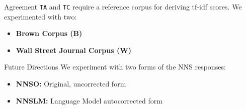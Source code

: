 \documentclass[final,t]{beamer}
\begin{document}
\begin{frame}{}
\begin{columns}[t]
\begin{column}{.64\linewidth}
\begin{columns}
\begin{column}{.48\linewidth}
\begin{block}{Agreement}
\texttt{TA} and \texttt{TC} require a reference corpus for deriving tf-idf scores. We experimented with two:
\begin{center}
\begin{minipage}{.49\textwidth}
  \begin{mdframed}[innertopmargin=15pt,innerbottommargin=15pt,roundcorner=10pt]
  \begin{center}
  \begin{minipage}{.8\textwidth}
    \begin{itemize}
    \item{\textbf{Brown Corpus (B)}}
    \item{\textbf{Wall Street Journal Corpus (W)}}
    \end{itemize}
  \end{minipage}
  \end{center}
  \end{mdframed}
\end{minipage}
\end{center}
\vspace{-.5em}
\end{block}

\begin{block}{Future Directions}
We experiment with two forms of the NNS responses:
\begin{center}
\begin{minipage}{.6\textwidth}
  \begin{mdframed}[innertopmargin=15pt,innerbottommargin=15pt,roundcorner=10pt]
  \begin{center}
  \begin{minipage}{.85\textwidth}
    \begin{itemize}
	\item{\textbf{NNSO:} Original, uncorrected form}
	\item{\textbf{NNSLM:} Language Model autocorrected form}
    \end{itemize}
  \end{minipage}
  \end{center}
  \end{mdframed}
\end{minipage}
\end{center}
\vspace{-.5em}
\end{block}

\end{column}


\end{columns}
\end{column}
\end{columns}
\end{frame}
\end{document}

